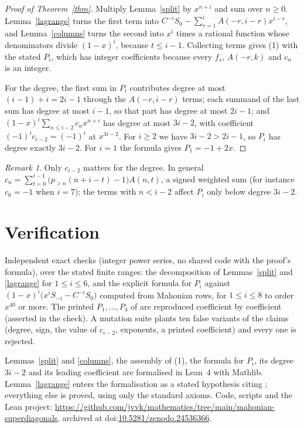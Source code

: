 \documentclass[11pt]{amsart}
\theoremstyle{remark}\newtheorem*{remark}{Remark}
\begin{document}
\begin{proof}[Proof of Theorem~\ref{thm}]
Multiply Lemma~\ref{split} by $x^{n+i}$ and sum over $n\ge0$. Lemma~\ref{lagrange} turns the first term into
$C^{-i}S_0-\sum_{r=1}^{i}A(-r,i-r)x^{i-r}$, and Lemma~\ref{columns} turns the second into $x^i$ times a rational function
whose denominators divide $(1-x)^i$, because $t\le i-1$. Collecting terms gives (1) with the stated $P_i$, which has
integer coefficients because every $f_s$, $A(-r,k)$ and $c_n$ is an integer.

For the degree, the first sum in $P_i$ contributes degree at most $(i-1)+i=2i-1$ through the $A(-r,i-r)$ terms; each
summand of the last sum has degree at most $i-1$, so that part has degree at most $2i-1$; and
$(1-x)^i\sum_{n\le i-2}c_nx^{n+i}$ has degree at most $3i-2$, with coefficient $(-1)^ic_{i-2}=(-1)^i$ at $x^{3i-2}$. For
$i\ge2$ we have $3i-2>2i-1$, so $P_i$ has degree exactly $3i-2$. For $i=1$ the formula gives $P_1=-1+2x$.
\end{proof}

\begin{remark}
Only $c_{i-2}$ matters for the degree. In general
$c_n=\sum_{t=0}^{i-1}\bigl(p_{>n}(n+i-t)-1\bigr)A(n,t)$, a signed weighted sum (for instance $c_0=-1$ when $i=7$); the
terms with $n<i-2$ affect $P_i$ only below degree $3i-2$.
\end{remark}

\section*{Verification}
Independent exact checks (integer power series, no shared code with the proof's formula), over the stated finite ranges: the decomposition of
Lemmas~\ref{split} and \ref{lagrange} for $1\le i\le6$, and the explicit formula for $P_i$ against
$(1-x)^i\bigl(x^iS_{-i}-C^{-i}S_0\bigr)$ computed from Mahonian rows, for $1\le i\le 8$ to order $x^{40}$ or more. The
printed $P_1,\dots,P_4$ of \cite{CFS} are reproduced coefficient by coefficient (asserted in the check). A mutation suite plants ten false variants of the claims
(degree, sign, the value of $c_{i-2}$, exponents, a printed coefficient) and every one is rejected.

Lemmas~\ref{split} and \ref{columns}, the assembly of (1), the formula for $P_i$, its degree $3i-2$ and its leading
coefficient are formalised in Lean~4 with Mathlib. Lemma~\ref{lagrange} enters the formalisation as a stated
hypothesis citing \cite{G}; everything else is proved, using only the standard axioms. Code, scripts and the Lean
project: \url{https://github.com/jvvk/mathematics/tree/main/mahonian-superdiagonals}, archived at
doi:\href{https://doi.org/10.5281/zenodo.24536366}{10.5281/zenodo.24536366}.
\end{document}
